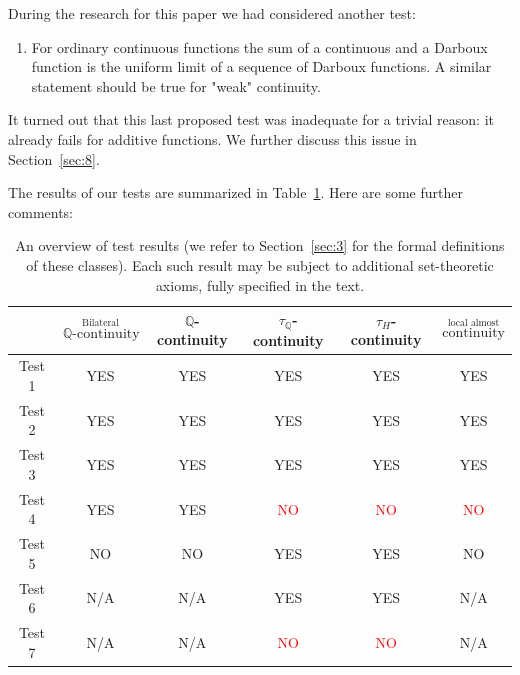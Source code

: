 \documentclass[11pt]{amsart} %
\theoremstyle{definition}
\newcommand{\Q}{\mathbb{Q}}
\begin{document}
During the research for this paper we had considered another test:
\begin{enumerate}[start=9] 
\item For ordinary continuous functions the sum of a continuous and a Darboux
function is the uniform limit of a sequence of Darboux functions. A similar statement should be true for "weak" continuity. 
\end{enumerate} 

It turned out that this last proposed test was inadequate for a trivial reason: it already fails for additive functions. We
further discuss this issue in Section~\ref{sec:8}.

The results of our tests are summarized in Table~\ref{table:1}. Here are some further
comments:

\begin{table}[h]
\begin{tabular}{|c|c|c|c|c|c|}
\toprule
 & $\stackrel{\mbox{Bilateral}}{\mathbb{Q}\mbox{-continuity}}$  & $\mathbb{Q}$-continuity & $\tau_{\Q}$-continuity & $\tau_H$-continuity & $\stackrel{\mbox{local almost}}{\mbox{continuity}}$ \\
\midrule
Test 1 & YES & YES & YES & YES & YES \\
\hline
Test 2 & YES & YES & YES & YES & YES \\
\hline
Test 3 & YES & YES & YES & YES & YES \\
\hline
Test 4 & YES & YES & \textcolor{red}{NO} & \textcolor{red}{NO} & \textcolor{red}{NO}\\
\hline
Test 5 & NO & NO & YES & YES & NO\\
\hline 
Test 6 & N/A & N/A & YES & YES & N/A\\
\hline 
Test 7 & N/A & N/A & \textcolor{red}{NO} & \textcolor{red}{NO} & N/A\\
\bottomrule
\end{tabular}
\vspace{0.2cm}
\caption{An overview of test results (we refer to Section~\ref{sec:3} for the formal definitions of these classes). Each such result may be subject to additional set-theoretic axioms, fully specified in the text.}
\label{table:1} 
\end{table}
\end{document}
